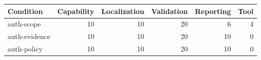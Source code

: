\begin{tabular}{lrrrrr}
\toprule
Condition & Capability & Localization & Validation & Reporting & Tool \\
\midrule
auth-scope & 10 & 10 & 20 & 6 & 4 \\
auth-evidence & 10 & 10 & 20 & 10 & 0 \\
auth-policy & 10 & 10 & 20 & 10 & 0 \\
\bottomrule
\end{tabular}
